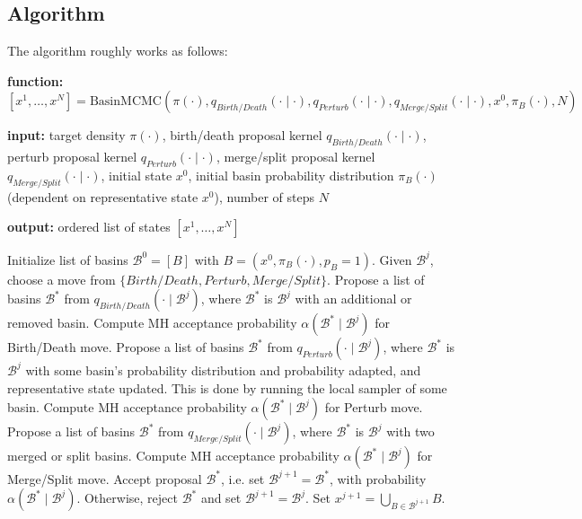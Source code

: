 \documentclass[12pt]{article}
\theoremstyle{definition}
\theoremstyle{remark}
\theoremstyle{plain}
\begin{document}
\subsection{Algorithm}
The algorithm roughly works as follows:
\begin{algorithm}[H]
  \caption{Basin MCMC}
  \label{alg:basin_mcmc}
  \textbf{function:} $[x^1,\ldots,x^N] =
  \mathrm{BasinMCMC}\left(\pi(\cdot), q_{Birth/Death}(\cdot\mid\cdot), q_{Perturb}(\cdot\mid\cdot), q_{Merge/Split}(\cdot\mid\cdot), x^0, \pi_{B}(\cdot), N\right)$
  
  \textbf{input:} target density $\pi(\cdot)$, 
  birth/death proposal kernel $q_{Birth/Death}(\cdot\mid\cdot)$, 
  perturb proposal kernel $q_{Perturb}(\cdot\mid\cdot)$, 
  merge/split proposal kernel $q_{Merge/Split}(\cdot\mid\cdot)$, 
  initial state $x^0$, initial basin probability distribution $\pi_{B}(\cdot)$ (dependent on representative state $x^0$), 
  number of steps $N$
  
  \textbf{output:} ordered list of states $[x^1,\ldots,x^N]$
  
\begin{algorithmic}[1]
  \State Initialize list of basins $\mathcal{B}^0 = [B]$ with $B=(x^0, \pi_{B}(\cdot), p_{B} = 1)$.
    \State Given $\mathcal{B}^j$, choose a move from $\{Birth/Death, Perturb, Merge/Split\}$.
      \State Propose a list of basins $\mathcal{B}^{*}$ from $q_{Birth/Death}(\cdot\mid\mathcal{B}^j)$, where 
      $\mathcal{B}^*$ is $\mathcal{B}^j$ with an additional or removed basin. 
      \State Compute MH acceptance probability $\alpha(\mathcal{B}^{*} \mid \mathcal{B}^j)$ for Birth/Death move.
      \State Propose a list of basins $\mathcal{B}^{*}$ from $q_{Perturb}(\cdot\mid\mathcal{B}^j)$, where 
      $\mathcal{B}^*$ is $\mathcal{B}^j$ with some basin's probability distribution and probability adapted, and representative state updated.
      This is done by running the local sampler of some basin.
      \State Compute MH acceptance probability $\alpha(\mathcal{B}^{*} \mid \mathcal{B}^j)$ for Perturb move.
      \State Propose a list of basins $\mathcal{B}^{*}$ from $q_{Merge/Split}(\cdot\mid\mathcal{B}^j)$, where 
      $\mathcal{B}^*$ is $\mathcal{B}^j$ with two merged or split basins.
      \State Compute MH acceptance probability $\alpha(\mathcal{B}^{*} \mid \mathcal{B}^j)$ for Merge/Split move.
    \EndIf
    \State Accept proposal $\mathcal{B}^{*}$, i.e. set $\mathcal{B}^{j+1} = \mathcal{B}^{*}$, with probability $\alpha(\mathcal{B}^{*} \mid \mathcal{B}^j)$. 
    \State Otherwise, reject $\mathcal{B}^{*}$ and set $\mathcal{B}^{j+1} = \mathcal{B}^j$.
    \State Set $x^{j+1} = \bigcup_{B \in \mathcal{B}^{j+1}} B$.
  \EndFor
  \end{algorithmic}
\end{algorithm}
\end{document}
